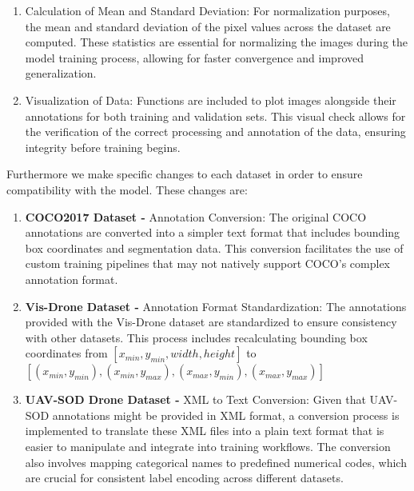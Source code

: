 \begin{enumerate}
    \item Calculation of Mean and Standard Deviation: For normalization purposes, the mean and standard deviation of the pixel values across the dataset are 
    computed. These statistics are essential for normalizing the images during the model training process, 
    allowing for faster convergence and improved generalization.

    \item Visualization of Data: Functions are included to plot images alongside their annotations for both training and validation sets. This visual check 
    allows for the verification of the correct processing and annotation of the data, ensuring integrity before training begins.

  \end{enumerate}



\newpage

Furthermore we make specific changes to each dataset in order to ensure compatibility with the model. These changes are:

\begin{enumerate}
    \item \textbf{COCO2017 Dataset - } Annotation Conversion: The original COCO annotations are converted into a simpler text format that includes bounding 
    box coordinates and segmentation data. This conversion facilitates the use of custom training pipelines that may not natively support COCO's complex 
    annotation format.

    \item \textbf{Vis-Drone Dataset - } Annotation Format Standardization: The annotations provided with the Vis-Drone dataset are standardized to ensure 
    consistency with other datasets. This process includes recalculating bounding box coordinates from $[x_{min}, y_{min}, width, height]$ to  
    $[(x_{min}, y_{min}), (x_{min}, y_{max}), (x_{max}, y_{min}), (x_{max}, y_{max})]$

    \item \textbf{UAV-SOD Drone Dataset - } XML to Text Conversion: Given that UAV-SOD annotations might be provided in XML format, a conversion process 
    is implemented to translate these XML files into a plain text format that is easier to manipulate and integrate into training workflows. The conversion 
    also involves mapping categorical names to predefined numerical codes, which are crucial for consistent label encoding across different datasets.
\end{enumerate}

